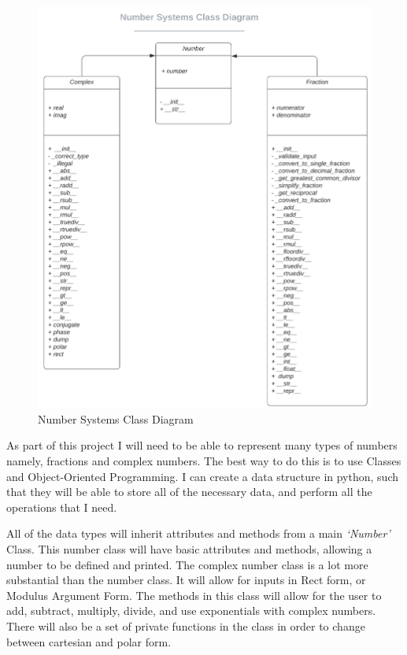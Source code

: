 \documentclass[12pt]{article}
\begin{document}
\begin{figure}[h]
    \centering
    \captionsetup{justification=centering}
    \includegraphics[width=6in]{number-systems-class-diagram}
    \caption{Number Systems Class Diagram}
\end{figure}
As part of this project I will need to be able to represent many types of numbers namely, fractions and complex numbers. The best way to do this is to use Classes and Object-Oriented Programming. I can create a data structure in python, such that they will be able to store all of the necessary data, and perform all the operations that I need.

All of the data types will inherit attributes and methods from a main \textit{‘Number’} Class. This number class will have basic attributes and methods, allowing a number to be defined and printed.
\clearpage
The complex number class is a lot more substantial than the number class.  It will allow for inputs in Rect form, or Modulus Argument Form. The methods in this class will allow for the user to add, subtract, multiply, divide, and use exponentials with complex numbers. There will also be a set of private functions in the class in order to change between cartesian and polar form.
\end{document}
